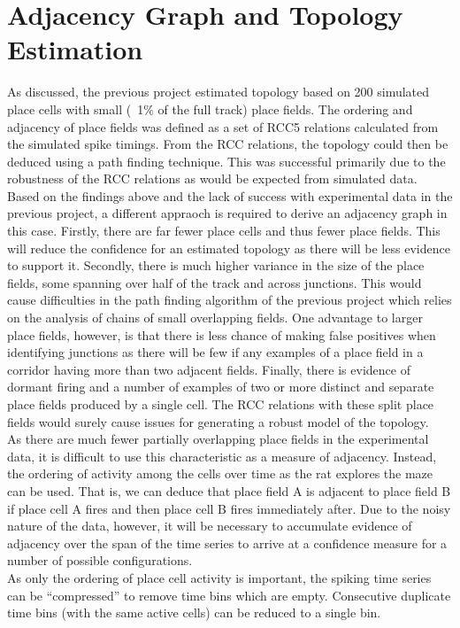 \documentclass[11pt]{report}
\begin{document}
\section{Adjacency Graph and Topology Estimation}
As discussed, the previous project estimated topology based on 200 simulated place cells with small (~1\% of the full track) place fields. The ordering and adjacency of place fields was defined as a set of RCC5 relations calculated from the simulated spike timings. From the RCC relations, the topology could then be deduced using a path finding technique. This was successful primarily due to the robustness of the RCC relations as would be expected from simulated data. Based on the findings above and the lack of success with experimental data in the previous project, a different appraoch is required to derive an adjacency graph in this case. Firstly, there are far fewer place cells and thus fewer place fields. This will reduce the confidence for an estimated topology as there will be less evidence to support it. Secondly, there is much higher variance in the size of the place fields, some spanning over half of the track and across junctions. This would cause difficulties in the path finding algorithm of the previous project which relies on the analysis of chains of small overlapping fields. One advantage to larger place fields, however, is that there is less chance of making false positives when identifying junctions as there will be few if any examples of a place field in a corridor having more than two adjacent fields. Finally, there is evidence of dormant firing and a number of examples of two or more distinct and separate place fields produced by a single cell. The RCC relations with these split place fields would surely cause issues for generating a robust model of the topology.\\
 
As there are much fewer partially overlapping place fields in the experimental data, it is difficult to use this characteristic as a measure of adjacency. Instead, the ordering of activity among the cells over time as the rat explores the maze can be used. That is, we can deduce that place field A is adjacent to place field B if place cell A fires and then place cell B fires immediately after. Due to the noisy nature of the data, however, it will be necessary to accumulate evidence of adjacency over the span of the time series to arrive at a confidence measure for a number of possible configurations. \\
As only the ordering of place cell activity is important, the spiking time series can be “compressed” to remove time bins which are empty. Consecutive duplicate time bins (with the same active cells) can be reduced to a single bin. \\
\end{document}
